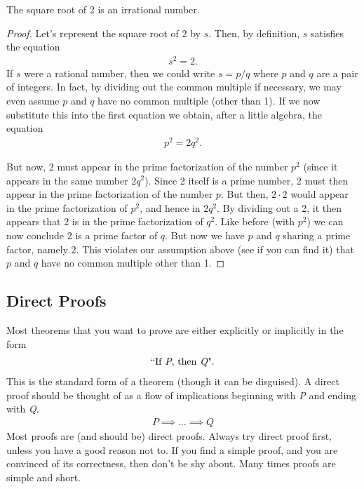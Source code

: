 \begin{theorem}
	\label{theorem:irrationality_of_sqrt2}
	 The square root of 2 is an irrational number.
\end{theorem}
\begin{proof}
	Let's represent the square root of 2 by $s$. Then, by definition, $s$ satisfies the equation
	\begin{align*}
		s^2 = 2.
	\end{align*}
	If $s$ were a rational number, then we could write $s = p/q$
where $p$ and $q$ are a pair of integers. In fact, by dividing out the common multiple if necessary, we may even assume $p$ and $q$ have no common multiple (other than 1). If we now substitute this into the first equation we obtain, after a little algebra, the equation
\begin{align*}
		p^2 = 2 q^2.
\end{align*}

But now, 2 must appear in the prime factorization of the number $p^2$ (since it appears in the same number $2 q^2$). Since 2 itself is a prime number, 2 must then appear in the prime factorization of the number $p$. But then, $2 \cdot 2$ would appear in the prime factorization of $p^2$, and hence in $2 q^2$. By dividing out a 2, it then appears that 2 is in the prime factorization of $q^2$. Like before (with $p^2$) we can now conclude 2 is a prime factor of $q$. But now we have $p$ and $q$ sharing a prime factor, namely 2. This violates our assumption above (see if you can find it) that $p$ and $q$ have no common multiple other than 1.
\end{proof}

\subsection{Direct Proofs}
Most theorems that you want to prove are either explicitly or implicitly in the form \begin{align*}
	\mbox{ ``If \textit{P}, then \textit{Q}". }
\end{align*} This is the standard form of a
theorem (though it can be disguised). A direct proof should be thought of as a flow of implications beginning
with \textit{P} and ending with \textit{Q}.
	\begin{align*}
		{P} \implies \dots \implies {Q}
	\end{align*}
Most proofs are (and should be) direct proofs. Always try direct proof first, unless you have a good reason not to. If you find a simple proof, and you are convinced of its correctness, then don't be shy about. Many times proofs
are simple and short.

